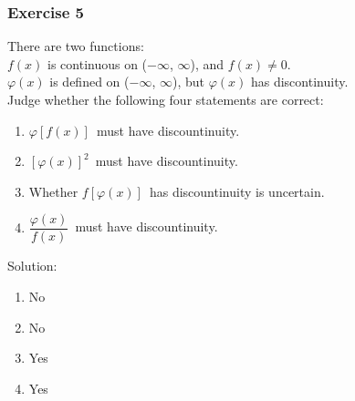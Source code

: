 \documentclass{beamer}
\begin{document}
	\begin{frame}
		\frametitle{Exercise 5}
		There are two functions:\\
		$f(x)$ is continuous on ($-\infty$, $\infty$), and $f(x) \neq 0$.\\ 
		$\varphi (x)$ is defined on ($-\infty$, $\infty$), but $\varphi (x)$ has discontinuity.\\
		\bigskip
		Judge whether the following four statements are correct:
		\begin{enumerate}
			\item $\varphi [f(x)]$\ must have discountinuity.
			\item $[\varphi (x)]^{2}$\ must have discountinuity.
			\item Whether $f[\varphi (x)]$\ has discountinuity is uncertain.
			\item $\dfrac{\varphi (x)}{f(x)}$\ must have discountinuity.
		\end{enumerate}
		
		Solution:
		
\begin{enumerate}
    \item No
    \item No
    \item Yes
    \item Yes
\end{enumerate}
	\end{frame}
\end{document}
